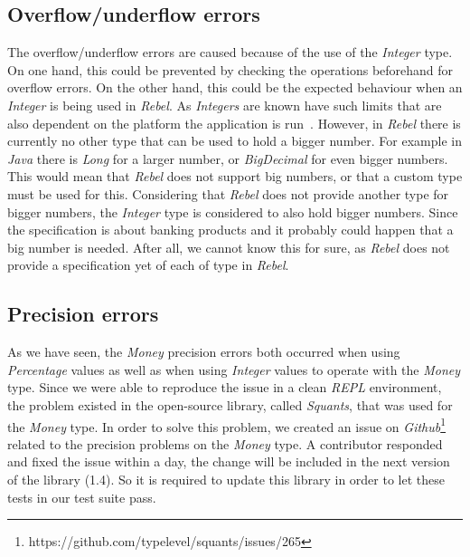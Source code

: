 \subsection*{Overflow/underflow errors}
The overflow/underflow errors are caused because of the use of the
\textit{Integer} type. On one hand, this could be prevented by checking the
operations beforehand for overflow errors. On the other hand, this could be the
expected behaviour when an \textit{Integer} is being used in \textit{Rebel}. As
\textit{Integers} are known have such limits that are also dependent on the
platform the application is run~\cite{wang2009intscope}. However, in
\textit{Rebel} there is currently no other type that can be used to hold a
bigger number. For example in \textit{Java} there is \textit{Long} for a larger
number, or \textit{BigDecimal} for even bigger numbers. This would mean that
\textit{Rebel} does not support big numbers, or that a custom type must be used
for this. Considering that \textit{Rebel} does not provide another type for
bigger numbers, the \textit{Integer} type is considered to also hold bigger
numbers. Since the specification is about banking products and it probably could
happen that a big number is needed. After all, we cannot know this for sure, as
\textit{Rebel} does not provide a specification yet of each of type in
\textit{Rebel}.

\subsection*{Precision errors}
As we have seen, the \textit{Money} precision errors both occurred when using
\textit{Percentage} values as well as when using \textit{Integer} values to
operate with the \textit{Money} type. Since we were able to reproduce the issue
in a clean \textit{REPL} environment, the problem existed in the open-source
library, called \textit{Squants}, that was used for the \textit{Money} type. In
order to solve this problem, we created an issue on
\textit{Github}\footnote{https://github.com/typelevel/squants/issues/265}
related to the precision problems on the \textit{Money} type. A contributor
responded and fixed the issue within a day, the change will be included in the
next version of the library (1.4). So it is required to update this library in
order to let these tests in our test suite pass.



